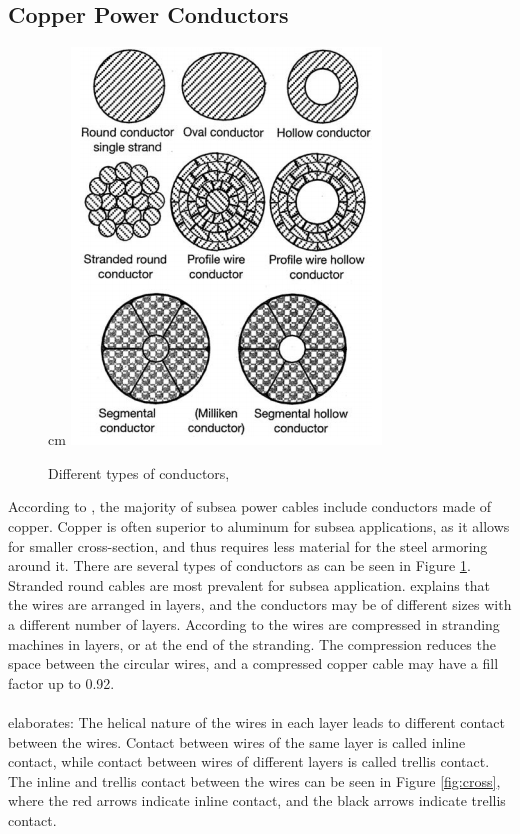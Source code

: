 \subsection{Copper Power Conductors}
  \begin{figure}
     cm 
    \centering
    \includegraphics[scale=0.6]{figures/conductors}
\caption[$\; \:$Different types of conductors]{Different types of conductors, \cite{Worzyk} }
 \label{fig:conductors}
\end{figure}
  According to \cite{Worzyk}, the majority of subsea power cables include conductors made of copper. Copper is often superior to aluminum for subsea applications, as it allows for smaller cross-section, and thus requires less material for the steel armoring around it. There are several  types of conductors as can be seen in Figure \ref{fig:conductors}. Stranded round cables are most prevalent for subsea application. \cite{Nasution2013} explains that the wires are arranged in layers, and the conductors may be of different sizes with a different number of layers. According to \cite{Worzyk} the wires are compressed in stranding machines in layers, or at the end of the stranding. The compression reduces the space between the circular wires, and a compressed copper cable may have a fill factor up to 0.92. 
  \\\\
 \cite{Nasution2013} elaborates: The helical nature of the wires in each layer leads to different contact between the wires. Contact between wires of the same layer is called inline contact, while contact between wires of different layers is called trellis contact. The inline and trellis contact between the wires can be seen in Figure \ref{fig:cross}, where the red arrows indicate inline contact, and the black arrows indicate trellis contact. 
